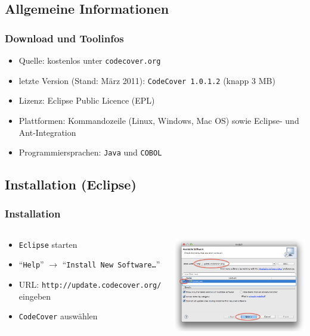 \documentclass{beamer}
\begin{document}
  \subsection{Allgemeine Informationen}
  \begin{frame}\frametitle{Download und Toolinfos}
    \begin{itemize}[<+->]
      \item Quelle: kostenlos unter \texttt{codecover.org}
      \item letzte Version (Stand: März 2011): \texttt{CodeCover 1.0.1.2} (knapp 3 MB)
      \item Lizenz: Eclipse Public Licence (EPL)
      \item Plattformen: Kommandozeile (Linux, Windows, Mac OS) sowie Eclipse- und Ant-Integration
      \item Programmiersprachen: \texttt{Java} und \texttt{COBOL}
    \end{itemize}
  \end{frame}

  \subsection{Installation (Eclipse)}
  \begin{frame}
    \frametitle{Installation}
    \begin{columns}
      \begin{column}{4cm}
        \begin{itemize}
          \item \texttt{Eclipse} starten
          \item ``\texttt{Help}'' $\rightarrow$ ``\texttt{Install New Software\dots}''
          \item URL: \texttt{http://update.code\-cover.org/} eingeben
          \item \texttt{CodeCover} auswählen
        \end{itemize}
        \vspace{2cm}
      \end{column}
      \begin{column}{6cm}
        \begin{overprint}
          \includegraphics[width=7cm]{pictures/install.png}
        \end{overprint}
      \end{column}
    \end{columns}
  \end{frame}
\end{document}

